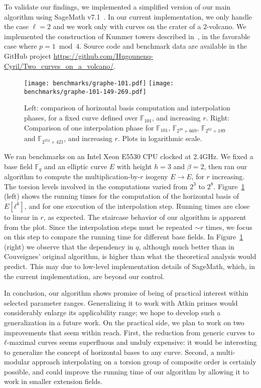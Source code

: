 \documentclass{lms}
\newcommand{\F}{\mathbb{F}}
\begin{document}
To validate our findings, we implemented a simplified version of our main algorithm using
SageMath v7.1~\cite{sage}. In our current implementation, we only
handle the case $\ell=2$ and we work only with curves on the
crater of a $2$-volcano.  We implemented the
construction of Kummer towers described in~\cite{DoSc12}, in the
favorable case where $p = 1 \bmod 4$. Source code and benchmark data
are available in the GitHub project
\url{https://github.com/Hugounenq-Cyril/Two_curves_on_a_volcano/}.

\begin{figure}%
\centering
\texttt{[image: benchmarks/graphe-101.pdf]}
\hfill
\texttt{[image: benchmarks/graphe-101-149-269.pdf]}
\caption{Left: comparison of horizontal basis computation and
  interpolation phases, for a fixed curve defined over $\F_{101}$, and
  increasing $r$. Right: Comparison of one interpolation phase for
  $\F_{101}$, $\F_{2^{30}+669}$, $\F_{2^{62}+189}$ and $\F_{2^{252}+421}$, and increasing
  $r$. Plots in logarithmic scale.}
\label{fig:benchs}
\end{figure}

We ran benchmarks on an Intel Xeon E5530 CPU clocked at 2.4GHz. We
fixed a base field $\F_q$ and an elliptic curve $E$ with height $h=3$ and $\beta=2$,
then ran our algorithm to compute the multiplication-by-$r$ isogeny
$E→E$, for $r$ increasing.  The torsion levels involved in the
computations varied from $2^3$ to $2^8$.  Figure~\ref{fig:benchs}
(left) shows the running times for the computation of the horizontal
basis of $E[ℓ^k]$, and for one execution of the interpolation
step. Running times are close to linear in $r$,
as expected. The staircase behavior of our algorithm is apparent from
the plot. Since the interpolation steps must be repeated $\sim r$ times,
we focus on this step to compare the running
time for different base fields. In Figure~\ref{fig:benchs} (right)
we observe that the dependency in $q$, although much better than in
Couveignes' original algorithm, is higher than what the theoretical 
analysis would predict. This may due to low-level implementation details
of SageMath, which, in the current implementation, are beyond our control.

In conclusion, our algorithm shows promise of being of practical
interest within selected parameter ranges. Generalizing it to work
with Atkin primes would considerably enlarge its applicability range;
we hope to develop such a generalization in a future work. On the
practical side, we plan to work on two improvements that seem within
reach. First, the reduction from generic curves to $ℓ$-maximal curves
seems superfluous and unduly expensive: it would be interesting to
generalize the concept of horizontal bases to any curve. Second, a
multi-modular approach interpolating on a torsion group of composite
order is certainly possible, and could improve the running time of our
algorithm by allowing it to work in smaller extension fields.
\end{document}
